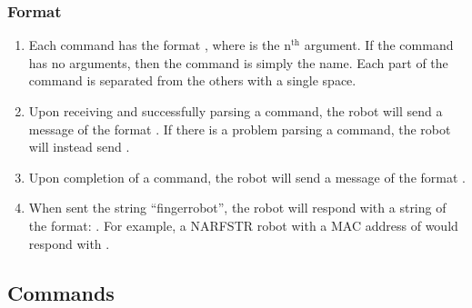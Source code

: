 \documentclass[letterpaper,10pt,english]{sphinxmanual}
\begin{document}
\subsubsection{Format}
\label{Use:format}\begin{enumerate}
\item {} 
Each command has the format , where  is the n$^{\text{th}}$ argument. If the command has no arguments, then the command is simply the name. Each part of the command is separated from the others with a single space.

\item {} 
Upon receiving and successfully parsing a command, the robot will send a message of the format . If there is a problem parsing a command, the robot will instead send .

\item {} 
Upon completion of a command, the robot will send a message of the format .

\item {} 
When sent the string “fingerrobot”, the robot will respond with a string of the format: . For example, a NARFSTR robot with a MAC address of  would respond with .

\end{enumerate}


\subsection{Commands}
\label{Use:commands}
\end{document}
